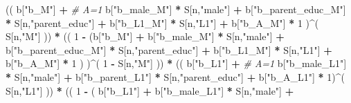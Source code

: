 \documentclass[
]{book}
\newenvironment{Shaded}{\begin{snugshade}}{\end{snugshade}}
\newcommand{\CommentTok}[1]{\textcolor[rgb]{0.56,0.35,0.01}{\textit{#1}}}
\newcommand{\DecValTok}[1]{\textcolor[rgb]{0.00,0.00,0.81}{#1}}
\newcommand{\NormalTok}[1]{#1}
\newcommand{\SpecialCharTok}[1]{\textcolor[rgb]{0.81,0.36,0.00}{\textbf{#1}}}
\newcommand{\StringTok}[1]{\textcolor[rgb]{0.31,0.60,0.02}{#1}}
\begin{document}
\begin{Shaded}
\begin{Highlighting}[]
\NormalTok{      (( b[}\StringTok{"b\_M"}\NormalTok{] }\SpecialCharTok{+}                                                             \CommentTok{\# A\textquotesingle{}=1}
\NormalTok{           b[}\StringTok{"b\_male\_M"}\NormalTok{] }\SpecialCharTok{*}\NormalTok{ S[n,}\StringTok{"male"}\NormalTok{] }\SpecialCharTok{+} 
\NormalTok{           b[}\StringTok{"b\_parent\_educ\_M"}\NormalTok{] }\SpecialCharTok{*}\NormalTok{ S[n,}\StringTok{"parent\_educ"}\NormalTok{] }\SpecialCharTok{+} 
\NormalTok{           b[}\StringTok{"b\_L1\_M"}\NormalTok{] }\SpecialCharTok{*}\NormalTok{ S[n,}\StringTok{"L1"}\NormalTok{] }\SpecialCharTok{+}
\NormalTok{           b[}\StringTok{"b\_A\_M"}\NormalTok{] }\SpecialCharTok{*} \DecValTok{1}\NormalTok{ )}\SpecialCharTok{\^{}}\NormalTok{( S[n,}\StringTok{"M"}\NormalTok{] )) }\SpecialCharTok{*}
\NormalTok{      (( }\DecValTok{1} \SpecialCharTok{{-}}\NormalTok{ (b[}\StringTok{"b\_M"}\NormalTok{] }\SpecialCharTok{+} 
\NormalTok{                b[}\StringTok{"b\_male\_M"}\NormalTok{] }\SpecialCharTok{*}\NormalTok{ S[n,}\StringTok{"male"}\NormalTok{] }\SpecialCharTok{+} 
\NormalTok{                b[}\StringTok{"b\_parent\_educ\_M"}\NormalTok{] }\SpecialCharTok{*}\NormalTok{ S[n,}\StringTok{"parent\_educ"}\NormalTok{] }\SpecialCharTok{+} 
\NormalTok{                b[}\StringTok{"b\_L1\_M"}\NormalTok{] }\SpecialCharTok{*}\NormalTok{ S[n,}\StringTok{"L1"}\NormalTok{] }\SpecialCharTok{+}
\NormalTok{                b[}\StringTok{"b\_A\_M"}\NormalTok{] }\SpecialCharTok{*} \DecValTok{1}\NormalTok{ ) )}\SpecialCharTok{\^{}}\NormalTok{( }\DecValTok{1} \SpecialCharTok{{-}}\NormalTok{ S[n,}\StringTok{"M"}\NormalTok{] )) }\SpecialCharTok{*}
\NormalTok{      (( b[}\StringTok{"b\_L1"}\NormalTok{] }\SpecialCharTok{+}                                                            \CommentTok{\# A=1}
\NormalTok{           b[}\StringTok{"b\_male\_L1"}\NormalTok{] }\SpecialCharTok{*}\NormalTok{ S[n,}\StringTok{"male"}\NormalTok{] }\SpecialCharTok{+}  
\NormalTok{           b[}\StringTok{"b\_parent\_L1"}\NormalTok{] }\SpecialCharTok{*}\NormalTok{ S[n,}\StringTok{"parent\_educ"}\NormalTok{] }\SpecialCharTok{+}
\NormalTok{           b[}\StringTok{"b\_A\_L1"}\NormalTok{] }\SpecialCharTok{*} \DecValTok{1}\NormalTok{)}\SpecialCharTok{\^{}}\NormalTok{( S[n,}\StringTok{"L1"}\NormalTok{] )) }\SpecialCharTok{*}
\NormalTok{      (( }\DecValTok{1} \SpecialCharTok{{-}}\NormalTok{ ( b[}\StringTok{"b\_L1"}\NormalTok{] }\SpecialCharTok{+}
\NormalTok{                 b[}\StringTok{"b\_male\_L1"}\NormalTok{] }\SpecialCharTok{*}\NormalTok{ S[n,}\StringTok{"male"}\NormalTok{] }\SpecialCharTok{+}  

\end{Highlighting}
\end{Shaded}
\end{document}
